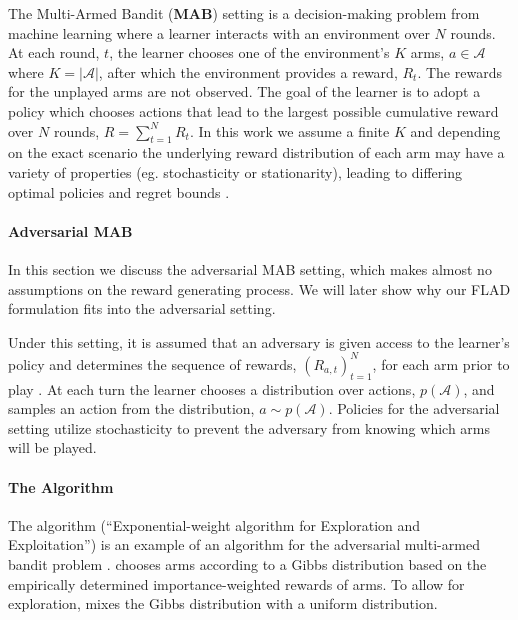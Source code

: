 The Multi-Armed Bandit (\textbf{MAB}) setting is a decision-making problem from machine learning where a learner interacts with an environment over $N$ rounds. At each round, $t$, the learner chooses one of the environment's $K$ arms, $a\in\mathcal{A}$ where $K=\vert\mathcal{A}\vert$, after which the environment provides a reward, $R_{t}$. The rewards for the unplayed arms are not observed. The goal of the learner is to adopt a policy which chooses actions that lead to the largest possible cumulative reward over $N$ rounds, $R=\sum_{t=1}^{N}R_{t}$.
In this work we assume a finite $K$ and depending on the exact scenario the underlying reward distribution of each arm may have a variety of properties (eg. stochasticity or stationarity), leading to differing optimal policies and regret bounds \citep{lattimore_szepesvári_2020}.

\paragraph{Adversarial MAB}
In this section we discuss the adversarial MAB setting, which makes almost no assumptions on the reward generating process. We will later show why our FLAD formulation fits into the adversarial setting.

Under this setting, it is assumed that an adversary is given access to the learner's policy and determines the sequence of rewards, $(R_{a,t})_{t=1}^{N}$, for each arm prior to play \citep{auer1995gambling}. At each turn the learner chooses a distribution over actions, $p(\mathcal{A})$, and samples an action from the distribution, $a\sim p(\mathcal{A})$. Policies for the adversarial setting utilize stochasticity to prevent the adversary from knowing which arms will be played.

\paragraph{The \ex{} Algorithm}
The \ex{} algorithm (``Exponential-weight algorithm for Exploration and Exploitation'') is an example of an algorithm for the adversarial multi-armed bandit problem \citet{auer2002nonstochastic}. \ex{} chooses arms according to a Gibbs distribution based on the empirically determined importance-weighted rewards of arms. To allow for exploration, \ex{} mixes the Gibbs distribution with a uniform distribution.

